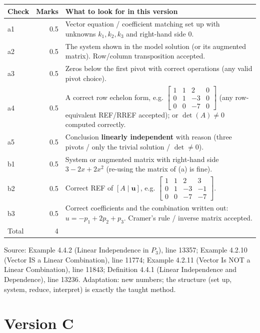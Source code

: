 \documentclass[11pt,a4paper]{article}
\newcommand{\Src}[1]{{\footnotesize\color{black!65}Source: #1}}
\begin{document}
\begin{tabularx}{\linewidth}{@{}l r >{\raggedright\arraybackslash}X@{}}\toprule Check & Marks & What to look for in this version\\\midrule
a1 & 0.5 & Vector equation / coefficient matching set up with unknowns $k_1,k_2,k_3$ and right-hand side $0$.\\
a2 & 0.5 & The system shown in the model solution (or its augmented matrix). Row/column transposition accepted.\\
a3 & 0.5 & Zeros below the first pivot with correct operations (any valid pivot choice).\\
a4 & 0.5 & A correct row echelon form, e.g. $\left[\begin{array}{ccc|c} 1 & 1 & 2 & 0 \\ 0 & 1 & -3 & 0 \\ 0 & 0 & -7 & 0 \end{array}\right]$ (any row-equivalent REF/RREF accepted); or $\det(A)\neq0$ computed correctly.\\
a5 & 0.5 & Conclusion \textbf{linearly independent} with reason (three pivots / only the trivial solution / $\det\neq0$).\\
b1 & 0.5 & System or augmented matrix with right-hand side $3-2x+2x^{2}$ (re-using the matrix of (a) is fine).\\
b2 & 0.5 & Correct REF of $[A\mid\mathbf{u}]$, e.g. $\left[\begin{array}{ccc|c} 1 & 1 & 2 & 3 \\ 0 & 1 & -3 & -1 \\ 0 & 0 & -7 & -7 \end{array}\right]$.\\
b3 & 0.5 & Correct coefficients and the combination written out: $u=-p_1+2p_2+p_3$. Cramer's rule / inverse matrix accepted.\\
\midrule Total & 4 & \\\bottomrule\end{tabularx}
\Src{Example 4.4.2 (Linear Independence in $P_3$), line 13357; Example 4.2.10 (Vector IS a Linear Combination), line 11774; Example 4.2.11 (Vector Is NOT a Linear Combination), line 11843; Definition 4.4.1 (Linear Independence and Dependence), line 13236. Adaptation: new numbers; the structure (set up, system, reduce, interpret) is exactly the taught method.}\par
\clearpage\section*{Version C}
\end{document}
